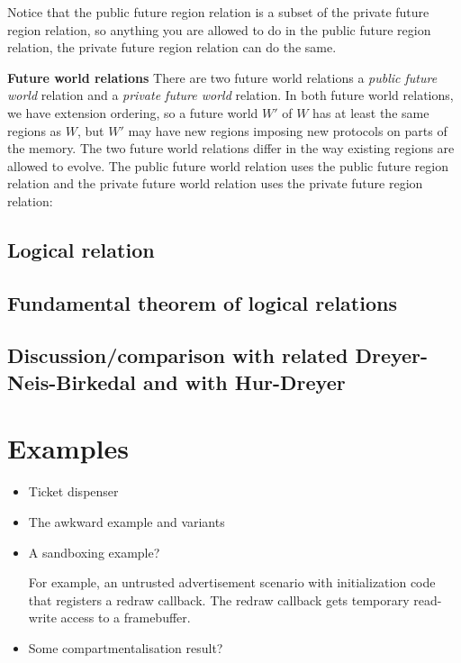 \documentclass[compsoc,conference,letterpaper,fleqn]{IEEEtran}
\DeclareMathOperator{\dom}{dom}
\newcommand{\var}[1]{\mathit{#1}}
\newcommand{\futurewk}{\mathbin{\sqsupseteq}^{\var{pub}}}
\newcommand{\futurestr}{\mathbin{\sqsupseteq}^{\var{priv}}}
\begin{document}
Notice that the public future region relation is a subset of the
private future region relation, so anything you are allowed to do in
the public future region relation, the private future region relation
can do the same.


{\bf Future world relations}
There are two future world relations a \emph{public future world}
relation and a \emph{private future world} relation. In both future
world relations, we have extension ordering, so a future world $W'$ of
$W$ has at least the same regions as $W$, but $W'$ may have new regions
imposing new protocols on parts of the memory. The two future world
relations differ in the way existing regions are allowed to
evolve. The public future world relation uses the public future region
relation and the private future world relation uses the private future
region relation:


\subsection{Logical relation}


\subsection{Fundamental theorem of logical relations}

\subsection{Discussion/comparison with related Dreyer-Neis-Birkedal and with Hur-Dreyer}


\section{Examples}
\begin{itemize}
\item Ticket dispenser
\item The awkward example and variants
\item A sandboxing example?

For example, an untrusted advertisement scenario with initialization code
that registers a redraw callback. The redraw callback gets temporary
read-write access to a framebuffer.

\item Some compartmentalisation result?
\end{itemize}
\end{document}
